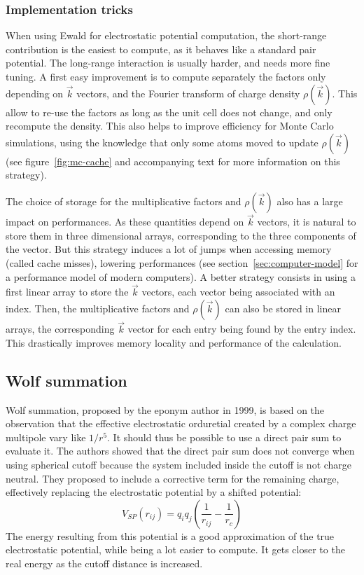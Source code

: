 \documentclass[thesis]{subfiles}
\begin{document}
\subsubsection{Implementation tricks}

When using Ewald for electrostatic potential computation, the short-range
contribution is the easiest to compute, as it behaves like a standard pair
potential. The long-range interaction is usually harder, and needs more fine
tuning. A first easy improvement is to compute separately the factors only
depending on $\vec k$ vectors, and the Fourier transform of charge density
$\rho(\vec k)$. This allow to re-use the factors as long as the unit cell does
not change, and only recompute the density. This also helps to improve
efficiency for Monte Carlo simulations, using the knowledge that only some atoms
moved to update $\rho(\vec k)$ (see figure~\ref{fig:mc-cache} and accompanying
text for more information on this strategy).

The choice of storage for the multiplicative factors and $\rho(\vec k)$ also has
a large impact on performances. As these quantities depend on $\vec k$ vectors,
it is natural to store them in three dimensional arrays, corresponding to the
three components of the vector. But this strategy induces a lot of jumps when
accessing memory (called cache misses), lowering performances (see
section~\ref{sec:computer-model} for a performance model of modern computers).
A better strategy consists in using a first linear array to store the $\vec k$
vectors, each vector being associated with an index. Then, the multiplicative
factors and $\rho(\vec k)$ can also be stored in linear arrays, the
corresponding $\vec k$ vector for each entry being found by the entry index.
This drastically improves memory locality and performance of the calculation.


\newpage
\subsection{Wolf summation}

Wolf summation, proposed by the eponym author in 1999\cite{Wolf1999}, is based
on the observation that the effective electrostatic orduretial created by a
complex charge multipole vary like $1/r^5$. It should thus be possible to use a
direct pair sum to evaluate it. The authors showed that the direct pair sum does
not converge when using spherical cutoff because the system included inside the
cutoff is not charge neutral. They proposed to include a corrective term for the
remaining charge, effectively replacing the electrostatic potential by a shifted
potential:
\[V_{SP}(r_{ij}) = q_i q_j \left(\frac{1}{r_{ij}} - \frac{1}{r_c} \right)\]
The energy resulting from this potential is a good approximation of the true
electrostatic potential, while being a lot easier to compute. It gets closer to
the real energy as the cutoff distance is increased.
\end{document}
